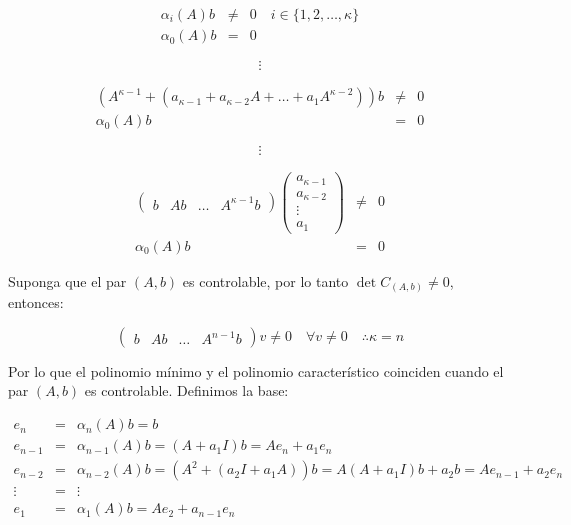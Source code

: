         \begin{eqnarray}
        \alpha_i(A) b & \ne & 0 \quad i \in \{ 1, 2, \dots, \kappa \} \nonumber \\
        \alpha_0(A) b & = & 0 \nonumber
        \end{eqnarray}

        \begin{equation}
            \vdots \nonumber
        \end{equation}

        \begin{eqnarray}
        (A^{\kappa - 1} + (a_{\kappa - 1} + a_{\kappa - 2} A + \dots + a_1 A^{\kappa - 2})) b & \ne & 0 \nonumber \\
        \alpha_0(A) b & = & 0 \nonumber
        \end{eqnarray}

        \begin{equation}
            \vdots \nonumber
        \end{equation}

        \begin{eqnarray}
        \begin{pmatrix}
        b & Ab & \dots & A^{\kappa - 1} b
        \end{pmatrix}
        \begin{pmatrix}
        a_{\kappa - 1} \\
        a_{\kappa - 2} \\
        \vdots \\
        a_{1}
        \end{pmatrix} & \ne & 0 \nonumber \\
        \alpha_0(A) b & = & 0 \nonumber
        \end{eqnarray}

        Suponga que el par $(A,b)$ es controlable, por lo tanto $\det{C_{(A,b)}} \ne 0$, entonces:

        \begin{equation}
            \begin{pmatrix}
            b & A b & \dots & A^{n-1} b
            \end{pmatrix} v \ne 0 \quad \forall v \ne 0 \quad \therefore \kappa = n
        \end{equation}

        Por lo que el polinomio mínimo y el polinomio característico coinciden cuando el par $(A,b)$ es controlable. Definimos la base:

        \begin{eqnarray}
        e_n & = & \alpha_n(A) b = b \nonumber \\
        e_{n-1} & = & \alpha_{n-1}(A) b = (A + a_1I) b = A e_n + a_1 e_n \nonumber \\
        e_{n-2} & = & \alpha_{n-2}(A) b = (A^2 + (a_2I + a_1A)) b = A(A+a_1I) b + a_2 b = A e_{n-1} + a_2 e_n \nonumber \\
        \vdots & = & \vdots \nonumber \\
        e_1 & = & \alpha_1(A) b = A e_2 + a_{n-1} e_n
        \end{eqnarray}

